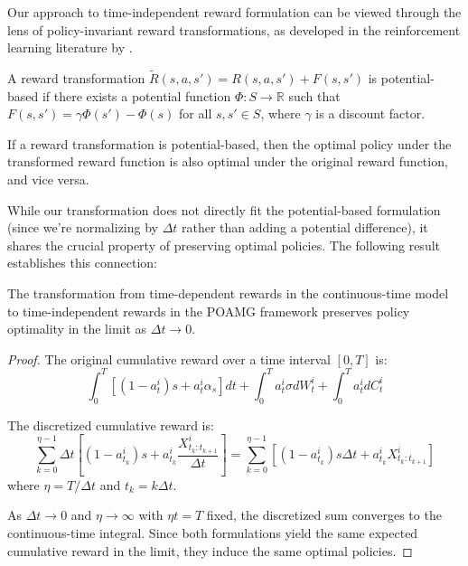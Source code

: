 Our approach to time-independent reward formulation can be viewed through the lens of policy-invariant reward transformations, as developed in the reinforcement learning literature by \citet{ng1999policy}.

\begin{definition}
    A reward transformation $\tilde{R}(s, a, s') = R(s, a, s') + F(s, s')$ is potential-based if there exists a potential function $\Phi: S \to \mathbb{R}$ such that $F(s, s') = \gamma\Phi(s') - \Phi(s)$ for all $s, s' \in S$, where $\gamma$ is a discount factor.
\end{definition}

\begin{theorem}
    If a reward transformation is potential-based, then the optimal policy under the transformed reward function is also optimal under the original reward function, and vice versa.
\end{theorem}

While our transformation does not directly fit the potential-based formulation (since we're normalizing by $\Delta t$ rather than adding a potential difference), it shares the crucial property of preserving optimal policies. The following result establishes this connection:

\begin{proposition}
    The transformation from time-dependent rewards in the continuous-time model to time-independent rewards in the POAMG framework preserves policy optimality in the limit as $\Delta t \to 0$.
\end{proposition}

\begin{proof}
    The original cumulative reward over a time interval $[0, T]$ is:
    \begin{equation}
        \int_0^T [(1-a^i_t)s + a^i_t\alpha_s] dt + \int_0^T a^i_t \sigma dW^i_t + \int_0^T a^i_t dC^i_t
    \end{equation}

    The discretized cumulative reward is:
    \begin{equation}
        \sum_{k=0}^{\eta-1} \Delta t \left[(1-a^i_{t_k})s + a^i_{t_k}\frac{X^i_{t_k:t_{k+1}}}{\Delta t}\right] = \sum_{k=0}^{\eta-1} [(1-a^i_{t_k})s\Delta t + a^i_{t_k}X^i_{t_k:t_{k+1}}]
    \end{equation}
    where $\eta = T/\Delta t$ and $t_k = k\Delta t$.

    As $\Delta t \to 0$ and $\eta \to \infty$ with $\eta t = T$ fixed, the discretized sum converges to the continuous-time integral. Since both formulations yield the same expected cumulative reward in the limit, they induce the same optimal policies.
\end{proof}


